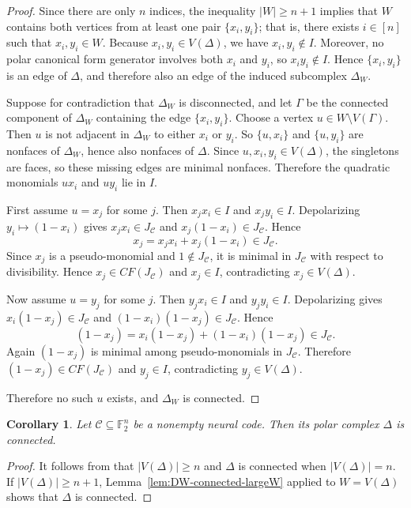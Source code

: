 \documentclass[12pt]{amsart}
\newtheorem{corollary}[theorem]{Corollary}
\theoremstyle{remark}
\theoremstyle{definition}
\newcommand{\F}{\mathbb{F}}
\newcommand{\C}{\mathcal{C}}
\begin{document}
\begin{proof}
Since there are only $n$ indices, the inequality $|W|\ge n+1$ implies that $W$ contains both vertices
from at least one pair $\{x_i,y_i\}$; that is, there exists $i\in[n]$ such that $x_i,y_i\in W$.
Because $x_i,y_i\in V(\Delta)$, we have $x_i,y_i\notin I$.
Moreover, no polar canonical form generator involves both $x_i$ and $y_i$, so $x_iy_i\notin I$.
Hence $\{x_i,y_i\}$ is an edge of $\Delta$, and therefore also an edge of the induced subcomplex $\Delta_W$.

Suppose for contradiction that $\Delta_W$ is disconnected, and let $\Gamma$ be the connected component
of $\Delta_W$ containing the edge $\{x_i,y_i\}$. Choose a vertex $u\in W\setminus V(\Gamma)$.
Then $u$ is not adjacent in $\Delta_W$ to either $x_i$ or $y_i$. So $\{u,x_i\}$ and $\{u,y_i\}$ are
nonfaces of $\Delta_W$, hence also nonfaces of $\Delta$.
Since $u,x_i,y_i\in V(\Delta)$, the singletons are faces, so these missing edges are minimal nonfaces.
Therefore the quadratic monomials $ux_i$ and $uy_i$ lie in $I$.

First assume $u=x_j$ for some $j$. Then $x_jx_i\in I$ and $x_jy_i\in I$.
Depolarizing $y_i\mapsto (1-x_i)$ gives $x_jx_i\in J_\C$ and $x_j(1-x_i)\in J_\C$. Hence
\[
x_j = x_jx_i + x_j(1-x_i)\in J_\C.
\]
Since $x_j$ is a pseudo-monomial and $1\notin J_\C$, it is minimal in $J_\C$
with respect to divisibility. Hence $x_j\in CF(J_\C)$ and $x_j\in I$, contradicting $x_j\in V(\Delta)$.

Now assume $u=y_j$ for some $j$. Then $y_jx_i\in I$ and $y_jy_i\in I$.
Depolarizing gives $x_i(1-x_j)\in J_\C$ and $(1-x_i)(1-x_j)\in J_\C$. Hence
\[
(1-x_j)=x_i(1-x_j)+(1-x_i)(1-x_j)\in J_\C.
\]
Again $(1-x_j)$ is minimal among pseudo-monomials in $J_\C$. Therefore
$(1-x_j)\in CF(J_\C)$ and $y_j\in I$, contradicting $y_j\in V(\Delta)$.


Therefore no such $u$ exists, and $\Delta_W$ is connected.
\end{proof}



\begin{corollary}\label{cor:polar-complex-connected}
Let $\C\subseteq \F_2^n$ be a nonempty neural code. Then its polar complex $\Delta$ is connected.
\end{corollary}

\begin{proof}
It follows from   that $|V(\Delta)|\geq n$ and $\Delta$ is connected when $|V(\Delta)|=n$.
If $|V(\Delta)|\ge n+1$,  Lemma~\ref{lem:DW-connected-largeW} applied to $W=V(\Delta)$
shows that $\Delta$ is connected.
\end{proof}
\end{document}
